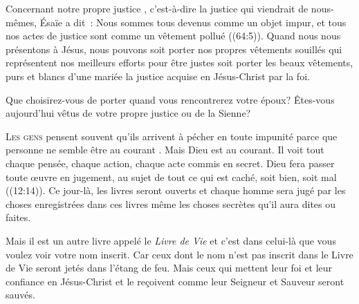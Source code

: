 
Concernant notre \og propre justice \fg{}, c'est-à-dire la justice
 qui viendrait de nous-mêmes, Ésaïe a dit~: 
 \og Nous sommes tous devenus comme un objet impur,
 et tous nos actes de justice sont comme un vêtement pollué \fg{}
 ((64:5)). Quand nous nous présentons à Jésus,
 nous pouvons soit porter nos propres vêtements souillés
 \ocadr qui représentent nos meilleurs efforts pour être justes \fcadr{}
 soit porter les beaux vêtements, purs et blancs d'une mariée
 \ocadr la justice acquise en Jésus-Christ par la foi. 

Que choisirez-vous de porter quand vous rencontrerez votre époux?
 Êtes-vous aujourd'hui vêtus de votre propre justice ou de la Sienne? 

\dvrule






\lettrine{L}{es gens} pensent souvent qu'ils arrivent à pécher
 en toute impunité parce que personne ne semble être au courant
 .
 Mais Dieu est au courant. Il voit tout \ocadr chaque pensée,
 chaque action, chaque acte commis en secret.
 \og Dieu fera passer toute \oe{}uvre en jugement,
 au sujet de tout ce qui est caché, soit bien, soit mal \fg{}
 ((12:14)).
 Ce jour-là, les livres seront ouverts et chaque homme
 sera jugé par les choses enregistrées dans ces livres
 \ocadr même les choses secrètes qu'il aura dites ou faites. 

Mais il est un autre livre appelé le \emph{Livre de Vie}
 et c'est dans celui-là que vous voulez voir votre nom inscrit.
 Car ceux dont le nom n'est pas inscrit dans le Livre de Vie
 seront jetés dans l'étang de feu.
 Mais ceux qui mettent leur foi et leur confiance en Jésus-Christ
 et le reçoivent comme leur Seigneur et Sauveur seront sauvés. 

